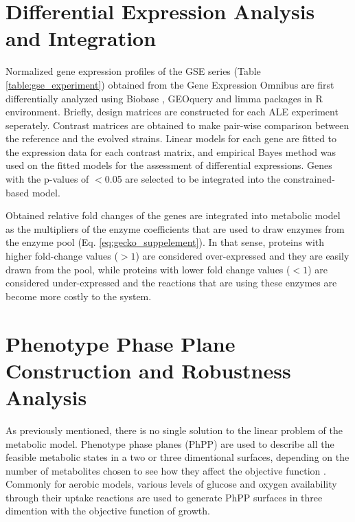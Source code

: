 \section{Differential Expression Analysis and Integration}
Normalized gene expression profiles of the GSE series (Table \ref{table:gse_experiment}) obtained from the Gene Expression Omnibus are first differentially analyzed using Biobase \cite{huber2015orchestrating}, GEOquery \cite{davis2007geoquery} and limma \cite{ritchie2015limma} packages in R environment. Briefly, design matrices are constructed for each ALE experiment seperately. Contrast matrices are obtained to make pair-wise comparison between the reference and the evolved strains. Linear models for each gene are fitted to the expression data for each contrast matrix, and empirical Bayes method was used on the fitted models for the assessment of differential expressions. Genes with the p-values of $<$0.05 are selected to be integrated into the constrained-based model.



Obtained relative fold changes of the genes are integrated into metabolic model as the multipliers of the enzyme coefficients that are used to draw enzymes from the enzyme pool (Eq. \ref{eq:gecko_suppelement}). In that sense, proteins with higher fold-change values ($>1$) are considered over-expressed and they are easily drawn from the pool, while proteins with lower fold change values ($<1$) are considered under-expressed and the reactions that are using these enzymes are become more costly to the system.



\section{Phenotype Phase Plane Construction and Robustness Analysis}

As previously mentioned, there is no single solution to the linear problem of the metabolic model. Phenotype phase planes (PhPP) are used to describe all the feasible metabolic states in a two or three dimentional surfaces, depending on the number of metabolites chosen to see how they affect the objective function \cite{edwards2002characterizing}. Commonly for aerobic models, various levels of glucose and oxygen availability through their uptake reactions are used to generate PhPP surfaces in three dimention with the objective function of growth.


